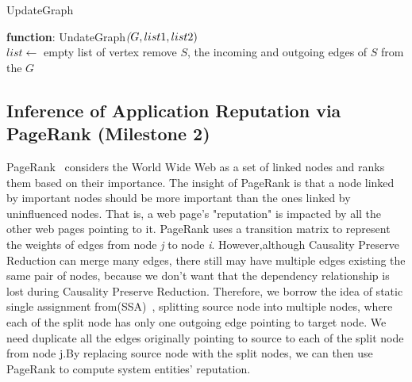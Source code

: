 \begin{algorithm}
	\caption{UpdateGraph}
	\textbf{function}: UndateGraph$\textit(G, list1, list2)$\\
	$list \leftarrow$ empty list of vertex\;
	remove $S$, the incoming and outgoing edges of $S$ from the $G$\;
	\label{alg:update}
\end{algorithm}



\subsection{Inference of Application Reputation via\\PageRank (Milestone 2)}

PageRank~\cite{pagerank} considers the World Wide Web as a set of linked nodes and ranks them based on their importance. The insight of PageRank is that a node linked by important nodes should be more important than the ones linked by uninfluenced nodes. That is, a web page's "reputation" is impacted by all the other web pages pointing to it. PageRank uses a transition matrix to represent the weights of edges from node \textit{j} to node \textit{i}. However,although Causality Preserve Reduction can merge many edges, there still may have multiple edges existing the same pair of nodes, because we don't want that the dependency relationship is lost during Causality Preserve Reduction. Therefore, we borrow the idea of static single assignment from(SSA)~\cite{nielson2004principles}, splitting source node  into multiple nodes, where each of the split node has only one outgoing edge pointing to target node. We need duplicate all the edges originally pointing to source to each of the split node from node j.By replacing source node with the split nodes, we can then use PageRank to compute system entities' reputation.

